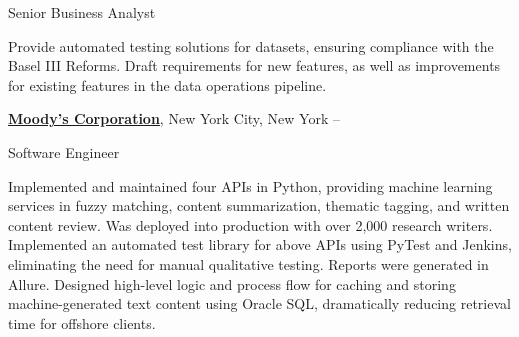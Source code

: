\documentclass[letterpaper,MMMyyyy,nonstopmode]{simpleresumecv}
\begin{document}
\begin{Body}
\Gap
\BulletItem
Senior Business Analyst
\begin{Detail}
\SubBulletItem
Provide automated testing solutions for datasets, ensuring compliance with the Basel III Reforms.
\SubBulletItem
Draft requirements for new features, as well as improvements for existing features in the data operations pipeline.
\end{Detail}

\BigGap
\Entry
\href{http://www.moodys.com}
{\textbf{Moody's Corporation}},
New York City, New York
\hfill
{} --

\Gap
\BulletItem
Software Engineer
\begin{Detail}
\SubBulletItem
Implemented and maintained four APIs in Python, providing machine learning services in fuzzy matching, content summarization, thematic tagging, and written content review. Was deployed into production with over 2,000 research writers.
\SubBulletItem
Implemented an automated test library for above APIs using PyTest and Jenkins, eliminating the need for manual qualitative testing. Reports were generated in Allure.
\SubBulletItem
Designed high-level logic and process flow for caching and storing machine-generated text content using Oracle SQL, dramatically reducing retrieval time for offshore clients.
\end{Detail}






\end{Body}
\end{document}
